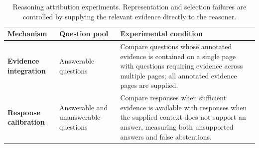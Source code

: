 \begin{table}[h]
\centering
\small
\setlength{\tabcolsep}{4pt}
\renewcommand{\arraystretch}{1.15}
\begin{tabularx}{\linewidth}{@{}
  >{\raggedright\arraybackslash}p{2.7cm}
  >{\raggedright\arraybackslash}p{3.0cm}
  >{\raggedright\arraybackslash}X@{}}
\toprule
\textbf{Mechanism} & \textbf{Question pool} & \textbf{Experimental condition} \\
\midrule
\textbf{Evidence integration}
& Answerable questions
& Compare questions whose annotated evidence is contained on a single page with questions requiring evidence across multiple pages; all annotated evidence pages are supplied. \\
\midrule
\textbf{Response calibration}
& Answerable and unanswerable questions
& Compare responses when sufficient evidence is available with responses when the supplied context does not support an answer, measuring both unsupported answers and false abstentions. \\
\bottomrule
\end{tabularx}
\caption{Reasoning attribution experiments. Representation and selection failures are controlled by supplying the relevant evidence directly to the reasoner.}
\label{tab:reasoning_experiments}
\end{table}